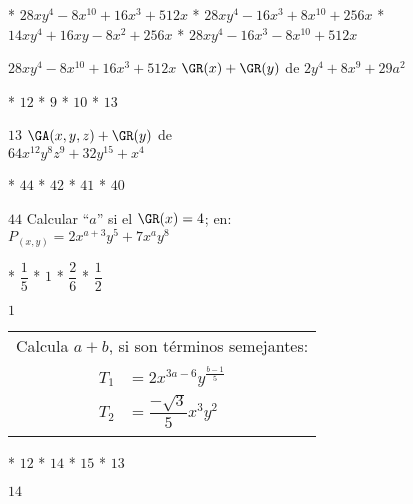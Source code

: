 \begin{enum}
	* $28xy^4-8x^{10}+16x^3+512x$
	* $28xy^4-16x^3+8x^{10}+256x$
	* $14xy^4+16xy-8x^2+256x$
	* $28xy^4-16x^3-8x^{10}+512x$
\end{enum}
$28xy^4-8x^{10}+16x^3+512x$
$\GR(x)+\GR(y)$ de $2y^4+8x^9+29a^2$
\begin{enum}
	* $12$
	* $9$
	* $10$
	* $13$
\end{enum}
$13$
$\GA(x,y,z)+\GR(y)$ de \\
$64x^{12}y^8z^9+32y^{15}+x^4$
\begin{enum}
	* $44$
	* $42$
	* $41$
	* $40$
\end{enum}
$44$
Calcular ``$a$'' si el $\GR(x)=4$; en: \\
$P_{(x,y)}=2x^{a+3}y^5+7x^ay^8$
\begin{task}
	* $\dfrac{1}{5}$
	* $1$
	* $\dfrac{2}{6}$
	* $\dfrac{1}{2}$
\end{task}
$1$
\begin{tabular}{c}
	Calcula $a+b$, si son t\'erminos semejantes: \\
	$\begin{aligned}
		T_1&=2x^{3a-6}y^{\frac{b-1}{5}} \\
		T_2&=\dfrac{-\sqrt{3}}{5}x^3y^2
	\end{aligned}$
\end{tabular}
\begin{enum}
	* $12$
	* $14$
	* $15$
	* $13$
\end{enum}
$14$
